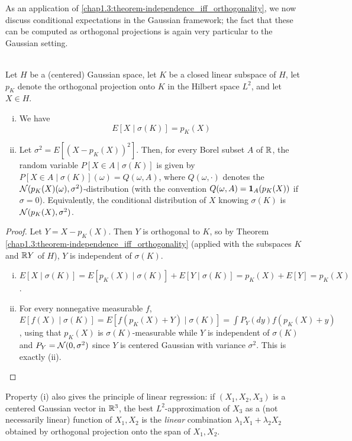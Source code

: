 As an application of \cref{chap1.3:theorem-independence_iff_orthogonality}, we now discuss conditional expectations in the Gaussian framework; the fact that these can be computed as orthogonal projections is again very particular to the Gaussian setting.

\begin{corollary}[Conditional expectation = projection] \label{chap1.3:corollary-conditional_expectation_as_projection}
 \\
Let $H$ be a (centered) Gaussian space, let $K$ be a closed linear subspace of $H$, let $p_K$ denote the orthogonal projection onto $K$ in the Hilbert space $L^2$, and let $X \in H$.
\begin{enumerate}[(i)]
    \item We have
    $$E[X \mid \sigma(K)]=p_K(X)$$
    \item Let $\sigma^2=E[(X-p_K(X))^2]$. Then, for every Borel subset $A$ of $\mathbb{R}$, the random variable $P[X \in A \mid \sigma(K)]$ is given by $P[X \in A \mid \sigma(K)](\omega)=Q(\omega,A)$, where $Q(\omega,\cdot)$ denotes the $\mathcal{N}(p_K(X)(\omega),\sigma^2)$-distribution (with the convention $Q(\omega,A)=\mathbf{1}_A(p_K(X))$ if $\sigma=0$). Equivalently, the conditional distribution of $X$ knowing $\sigma(K)$ is $\mathcal{N}(p_K(X),\sigma^2)$.
\end{enumerate}
\end{corollary}
\begin{proof}
Let $Y=X-p_K(X)$. Then $Y$ is orthogonal to $K$, so by Theorem \ref{chap1.3:theorem-independence_iff_orthogonality} (applied with the subspaces $K$ and $\mathbb{R} Y$ of $H$), $Y$ is independent of $\sigma(K)$.
\begin{enumerate}[(i)]
    \item $E[X \mid \sigma(K)]=E[p_K(X)\mid\sigma(K)]+E[Y\mid\sigma(K)]=p_K(X)+E[Y]=p_K(X)$.
    \item For every nonnegative measurable $f$, $E[f(X)\mid\sigma(K)]=E[f(p_K(X)+Y)\mid\sigma(K)]=\int P_Y(dy)f(p_K(X)+y)$, using that $p_K(X)$ is $\sigma(K)$-measurable while $Y$ is independent of $\sigma(K)$ and $P_Y=\mathcal{N}(0,\sigma^2)$ since $Y$ is centered Gaussian with variance $\sigma^2$. This is exactly (ii).
\end{enumerate}
\end{proof}
\begin{remark}
Property (i) also gives the principle of linear regression: if $(X_1,X_2,X_3)$ is a centered Gaussian vector in $\mathbb{R}^3$, the best $L^2$-approximation of $X_3$ as a (not necessarily linear) function of $X_1,X_2$ is the \emph{linear} combination $\lambda_1X_1+\lambda_2X_2$ obtained by orthogonal projection onto the span of $X_1,X_2$.
\end{remark}

